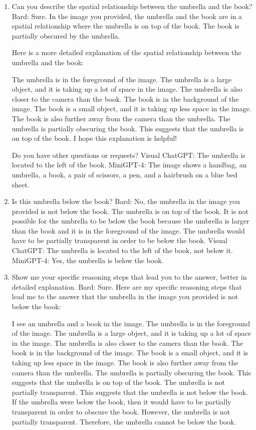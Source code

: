 \begin{enumerate}
    \item Can you describe the spatial relationship between the umbrella and the book?
    \subitem Bard: 
    Sure. In the image you provided, the umbrella and the book are in a spatial relationship where the umbrella is on top of the book. The book is partially obscured by the umbrella.
    
    Here is a more detailed explanation of the spatial relationship between the umbrella and the book:
    
    The umbrella is in the foreground of the image. The umbrella is a large object, and it is taking up a lot of space in the image. The umbrella is also closer to the camera than the book.
    The book is in the background of the image. The book is a small object, and it is taking up less space in the image. The book is also further away from the camera than the umbrella.
    The umbrella is partially obscuring the book. This suggests that the umbrella is on top of the book.
    I hope this explanation is helpful!
    
    Do you have other questions or requests?
    \subitem Visual ChatGPT: The umbrella is located to the left of the book.
    \subitem MiniGPT-4: The image shows a handbag, an umbrella, a book, a pair of scissors, a pen, and a hairbrush on a blue bed sheet.
    \item Is this umbrella below the book?
    \subitem Bard: 
    No, the umbrella in the image you provided is not below the book. The umbrella is on top of the book. It is not possible for the umbrella to be below the book because the umbrella is larger than the book and it is in the foreground of the image. The umbrella would have to be partially transparent in order to be below the book.
    \subitem Visual ChatGPT: The umbrella is located to the left of the book, not below it.
    \subitem MiniGPT-4: Yes, the umbrella is below the book.
    \item Show me your specific reasoning steps that lead you to the answer, better in detailed explanation.
    \subitem Bard: 
    Sure. Here are my specific reasoning steps that lead me to the answer that the umbrella in the image you provided is not below the book:
    
    I see an umbrella and a book in the image.
    The umbrella is in the foreground of the image. The umbrella is a large object, and it is taking up a lot of space in the image. The umbrella is also closer to the camera than the book.
    The book is in the background of the image. The book is a small object, and it is taking up less space in the image. The book is also further away from the camera than the umbrella.
    The umbrella is partially obscuring the book. This suggests that the umbrella is on top of the book.
    The umbrella is not partially transparent. This suggests that the umbrella is not below the book.
    If the umbrella were below the book, then it would have to be partially transparent in order to obscure the book. However, the umbrella is not partially transparent. Therefore, the umbrella cannot be below the book.
    

\end{enumerate}
